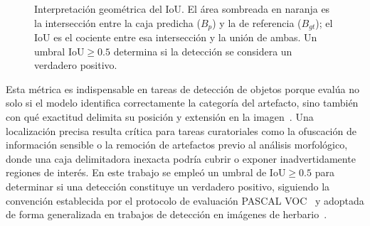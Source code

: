 \begin{figure}[H]
\centering
{}
\caption{Interpretación geométrica del IoU. El área sombreada en naranja es la intersección
         entre la caja predicha ($B_p$) y la de referencia ($B_{gt}$); el IoU es el cociente
         entre esa intersección y la unión de ambas. Un umbral $\mathrm{IoU}\ge 0.5$
         determina si la detección se considera un verdadero positivo.}
\label{fig:iou}
\end{figure} Esta métrica es indispensable en tareas de detección de objetos porque evalúa
no solo si el modelo identifica correctamente la categoría del artefacto, sino también
con qué exactitud delimita su posición y extensión en la imagen~\cite{everingham2010pascal}.
Una localización precisa resulta crítica para tareas curatoriales como la ofuscación
de información sensible o la remoción de artefactos previo al análisis morfológico, donde
una caja delimitadora inexacta podría cubrir o exponer inadvertidamente regiones de interés.
En este trabajo se empleó un umbral de $\text{IoU} \geq 0.5$ para determinar si una
detección constituye un verdadero positivo, siguiendo la convención establecida por el
protocolo de evaluación PASCAL VOC~\cite{everingham2010pascal} y adoptada de forma
generalizada en trabajos de detección en imágenes de herbario~\cite{waltonEtAl2023,
hussein2021}.






